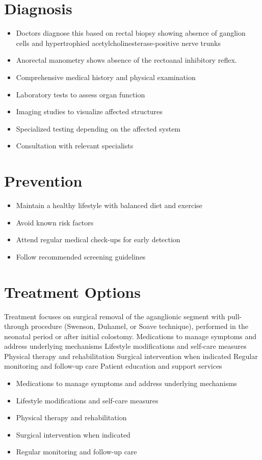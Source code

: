 \section{Diagnosis}
\begin{itemize}[noitemsep]
  \item Doctors diagnose this based on rectal biopsy showing absence of ganglion cells and hypertrophied acetylcholinesterase-positive nerve trunks
  \item Anorectal manometry shows absence of the rectoanal inhibitory reflex.
  \item Comprehensive medical history and physical examination
  \item Laboratory tests to assess organ function
  \item Imaging studies to visualize affected structures
  \item Specialized testing depending on the affected system
  \item Consultation with relevant specialists
\end{itemize}
\section{Prevention}
\begin{itemize}[noitemsep]
  \item Maintain a healthy lifestyle with balanced diet and exercise
  \item Avoid known risk factors
  \item Attend regular medical check-ups for early detection
  \item Follow recommended screening guidelines
\end{itemize}
\section{Treatment Options}
Treatment focuses on surgical removal of the aganglionic segment with pull-through procedure (Swenson, Duhamel, or Soave technique), performed in the neonatal period or after initial colostomy. Medications to manage symptoms and address underlying mechanisms Lifestyle modifications and self-care measures Physical therapy and rehabilitation Surgical intervention when indicated Regular monitoring and follow-up care Patient education and support services

\begin{itemize}[noitemsep]
  \item Medications to manage symptoms and address underlying mechanisms
  \item Lifestyle modifications and self-care measures
  \item Physical therapy and rehabilitation
  \item Surgical intervention when indicated
  \item Regular monitoring and follow-up care
\end{itemize}
